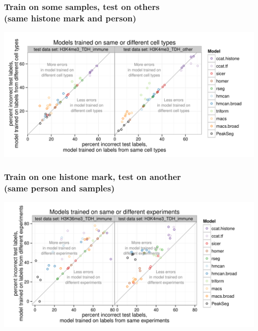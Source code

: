 \documentclass{beamer}
\begin{document}
\begin{frame}
  \frametitle{Train on some samples, test on others\\
(same histone mark and person)}
  \includegraphics[width=1.1\textwidth]{figure-test-H3K4me3-types.pdf}
\end{frame}

\begin{frame}
  \frametitle{Train on one histone mark, test on another\\
(same person and samples)}
  \includegraphics[width=1.1\textwidth]{figure-test-TDH-experiments.pdf}
\end{frame}
\end{document}
